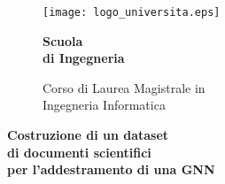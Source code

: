 \begin{titlepage}
	\begin{figure}[htbp]
		\begin{minipage}{0.3\textwidth}
			\centering
			\texttt{[image: logo\_universita.eps]}
		\end{minipage}
		
		\hspace{0.4\textwidth}

		\begin{minipage}{0.3\textwidth}
			\centering
			\begin{flushright}
				{\Large \textbf{Scuola\\di Ingegneria \\}}
			\end{flushright}
			
			\begin{flushright}
				Corso di Laurea Magistrale in \\	Ingegneria Informatica
			\end{flushright}
		\end{minipage}
	\end{figure}

	\vspace{15mm}

	\begin{center}
		{\huge{\bf Costruzione di un dataset\\di documenti scientifici\\per l'addestramento di una GNN\\}}
	\end{center}

	\vspace{25mm}

	\\

	\vfill
\end{titlepage}